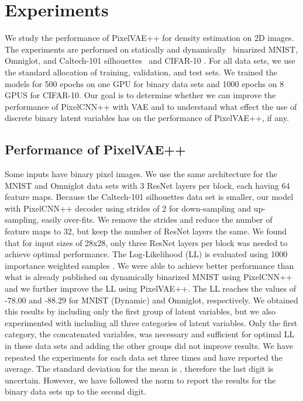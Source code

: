 \documentclass{article}
\begin{document}
\section{Experiments}
We study the performance of PixelVAE++ for density estimation on 2D images. The experiments are performed on statically and dynamically~\cite{lecun1998gradient} binarized MNIST, Omniglot, and Caltech-101 silhouettes~\cite{marlin2010inductive} and CIFAR-10 \cite{krizhevsky2009learning}. For all data sets, we use the standard allocation of training, validation, and test sets. We trained the models for 500 epochs on one GPU for binary data sets and 1000 epochs on 8 GPUS for CIFAR-10. Our goal is to determine whether we can improve the performance of PixelCNN++ with VAE and to understand what effect the use of discrete binary latent variables has on the performance of PixelVAE++, if any.


\subsection{Performance of PixelVAE++}
Some inputs have  binary pixel images. We use the same architecture for the MNIST and Omniglot data sets with 3 ResNet layers per block, each having 64 feature maps. Because the Caltech-101 silhouettes data set is smaller, our model with PixelCNN++ decoder using strides of 2 for down-sampling and up-sampling, easily over-fits. We remove the strides and reduce the number of feature maps to 32, but keep the number of ResNet layers the same. We found that for input sizes of 28x28, only three ResNet layers per block was needed to achieve optimal performance. The Log-Likelihood (LL) is evaluated using 1000 importance weighted samples \cite{burda2015importance}. We were able to achieve better performance than what is already published on dynamically binarized MNIST using PixelCNN++ and we further improve the LL using PixelVAE++. The LL reaches the values of -78.00 and -88.29 for MNIST (Dynamic) and Omniglot, respectively. We obtained this results by including only the first group of latent variables, but we also experimented with including all three categories of latent variables. Only the first category, the concatenated variables, was necessary and sufficient for optimal LL in these data sets and adding the other groups did not improve results. We have repeated the experiments for each data set three times and have reported the average. The standard deviation for the mean is , therefore the last digit is uncertain. However, we have followed the norm to report the results for the binary data sets up to the second digit. 
\end{document}
